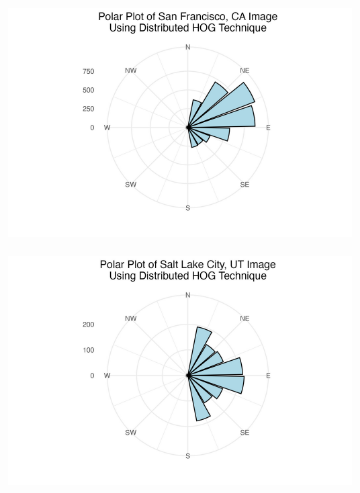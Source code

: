 \documentclass[
  letterpaper,
  DIV=11,
  numbers=noendperiod]{scrreprt}
\begin{document}
\begin{figure}

\begin{minipage}{0.33\linewidth}

\begin{figure}[H]

{\centering \includegraphics{images/plots/aerial_cities/sf_contribution_polar_plot.jpg}

}


\end{figure}%

\end{minipage}%
%
\begin{minipage}{0.33\linewidth}

\begin{figure}[H]

{\centering \includegraphics{images/plots/aerial_cities/salt_lake_contribution_polar_plot.jpg}

}
\end{figure}
\end{minipage}
\end{figure}
\end{document}
